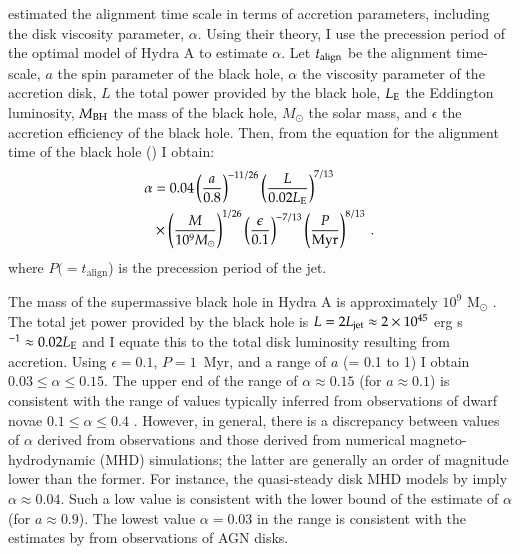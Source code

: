 \citet{natarajan98} estimated the alignment time scale in terms of accretion parameters, including the disk viscosity parameter, $\alpha$. Using their theory, I use the precession period of the optimal model of Hydra A to estimate $\alpha$. 
Let $t_{\rm align}$ be the alignment time-scale, $a$ the spin parameter of the black hole, $\alpha$ the viscosity parameter of the accretion disk, $L$ the total power provided by the black hole,
$L_{\rm E}$ the Eddington luminosity, $M_{\rm BH}$ the mass of the black hole, $M_{\odot}$ the solar mass, and $\epsilon$ the accretion efficiency of the black hole. Then, from the equation for the alignment time of the black hole (\citealt[][equation 2.16]{natarajan98}) I obtain:
\begin{align}
\alpha & = 0.04 \left(\frac{a}{0.8}\right)^{-11/26} \left(\frac{L}{0.02 L_{\rm E}}\right)^{7/13} \\ \nonumber 
           & \times \left(\frac{M}{ 10^9 M_{\odot}}\right)^{1/26}  \left(\frac{\epsilon}{0.1}\right)^{-7/13} \left(\frac{P}{\rm Myr}\right)^{8/13}\:.
\end{align}
where $P(=t_\mathrm{align}$) is the precession period of the jet.

The mass of the supermassive black hole in Hydra A is approximately $10^9$ M$_{\odot}$ \citep{fujita13}.
The total jet power provided by the black hole is $L=2L_{\rm jet}\approx 2 \times 10^{45}$ erg s$^{-1}\approx 0.02L_{\rm E}$ and I equate this to the total disk luminosity resulting from accretion. Using $\epsilon = 0.1$, $P=1$~Myr, and a range of $a$ (= 0.1 to 1) I obtain $0.03\le \alpha \le 0.15$. The upper end of the range of $\alpha \approx 0.15$ (for $a \approx 0.1$) is consistent with the range of values typically inferred from observations of dwarf novae $0.1\le \alpha \le 0.4$ \citep{king07}. However, in general, there is a discrepancy between values of $\alpha$ derived from observations and those derived from numerical magneto-hydrodynamic (MHD) simulations; the latter are generally an order of magnitude lower than the former. For instance, the quasi-steady disk MHD models by \citet{parkin13b} imply $\alpha \approx 0.04$. Such a low value is consistent with the lower bound of the estimate of $\alpha$ (for $a\approx 0.9$). The lowest value $\alpha = 0.03$ in the range is consistent with the estimates by \citet{starling04} from observations of AGN disks.


